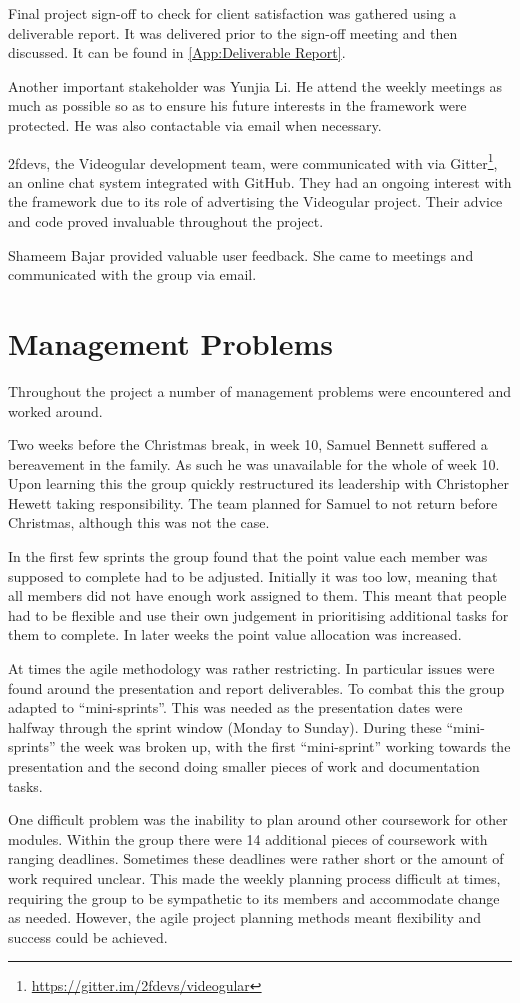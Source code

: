 Final project sign-off to check for client satisfaction was gathered using a deliverable report. It was delivered prior to the sign-off meeting and then discussed. It can be found in \cref{App:Deliverable Report}.

Another important stakeholder was Yunjia Li. He attend the weekly meetings as much as possible so as to ensure his future interests in the framework were protected. He was also contactable via email when necessary.

2fdevs, the Videogular development team, were communicated with via Gitter\footnote{\url{https://gitter.im/2fdevs/videogular}}, an online chat system integrated with GitHub. They had an ongoing interest with the framework due to its role of advertising the \gls{Videogular} project. Their advice and code proved invaluable throughout the project.

Shameem Bajar provided valuable user feedback. She came to meetings and communicated with the group via email.

\section{Management Problems}

Throughout the project a number of management problems were encountered and worked around.

Two weeks before the Christmas break, in week 10, Samuel Bennett suffered a bereavement in the family. As such he was unavailable for the whole of week 10. Upon learning this the group quickly restructured its leadership with Christopher Hewett taking responsibility. The team planned for Samuel to not return before Christmas, although this was not the case.

In the first few sprints the group found that the point value each member was supposed to complete had to be adjusted. Initially it was too low, meaning that all members did not have enough work assigned to them. This meant that people had to be flexible and use their own judgement in prioritising additional tasks for them to complete. In later weeks the point value allocation was increased.

At times the agile methodology was rather restricting. In particular issues were found around the presentation and report deliverables. To combat this the group adapted to ``mini-sprints''. This was needed as the presentation dates were halfway through the sprint window (Monday to Sunday). During these ``mini-sprints'' the week was broken up, with the first ``mini-sprint'' working towards the presentation and the second doing smaller pieces of work and documentation tasks.

One difficult problem was the inability to plan around other coursework for other modules. Within the group there were 14 additional pieces of coursework with ranging deadlines. Sometimes these deadlines were rather short or the amount of work required unclear. This made the weekly planning process difficult at times, requiring the group to be sympathetic to its members and accommodate change as needed. However, the agile project planning methods meant flexibility and success could be achieved.
